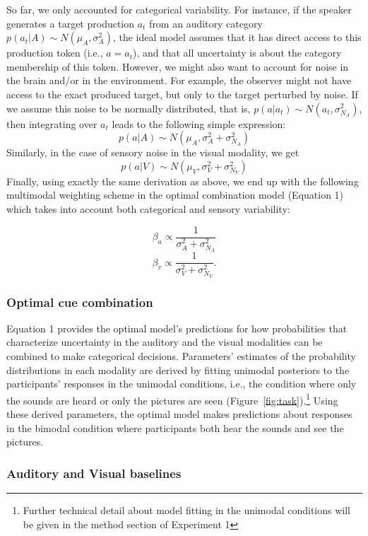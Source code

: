 \documentclass[english,floatsintext,man]{apa6}
\theoremstyle{definition}
\theoremstyle{definition}
\theoremstyle{definition}
\theoremstyle{remark}
\begin{document}
So far, we only accounted for categorical variability. For instance, if
the speaker generates a target production \(a_t\) from an auditory
category \(p(a_t | A) \sim N(\mu_{A}, \sigma^2_{A})\), the ideal model
assumes that it has direct access to this production token (i.e.,
\(a=a_t\)), and that all uncertainty is about the category membership of
this token. However, we might also want to account for noise in the
brain and/or in the environment. For example, the observer might not
have access to the exact produced target, but only to the target
perturbed by noise. If we assume this noise to be normally distributed,
that is, \(p(a | a_t) \sim N(a_t, \sigma^2_{N_A})\), then integrating
over \(a_t\) leads to the following simple expression:
\[ p(a | A) \sim N(\mu_{A}, \sigma^2_{A}+\sigma^2_{N_A})\] Similarly, in
the case of sensory noise in the visual modality, we get
\[ p(a | V) \sim N(\mu_{V}, \sigma^2_{V}+\sigma^2_{N_V})\] Finally,
using exactly the same derivation as above, we end up with the following
multimodal weighting scheme in the optimal combination model (Equation
1) which takes into account both categorical and sensory variability:

\[\beta_a \propto \frac{1}{\sigma^2_{A}+\sigma^2_{N_A}}\]
\[\beta_v \propto \frac{1}{\sigma^2_{V} +\sigma^2_{N_V}}.\]

\subsubsection{Optimal cue combination}\label{optimal-cue-combination}

Equation 1 provides the optimal model's predictions for how
probabilities that characterize uncertainty in the auditory and the
visual modalities can be combined to make categorical decisions.
Parameters' estimates of the probability distributions in each modality
are derived by fitting unimodal posteriors to the participants'
responses in the unimodal conditions, i.e., the condition where only the
sounds are heard or only the pictures are seen
(Figure~\ref{fig:task}).\footnote{Further technical detail about model fitting in the unimodal conditions will be given in the method section of Experiment 1}
Using these derived parameters, the optimal model makes predictions
about responses in the bimodal condition where participants both hear
the sounds and see the pictures.

\subsubsection{Auditory and Visual
baselines}\label{auditory-and-visual-baselines}
\end{document}
